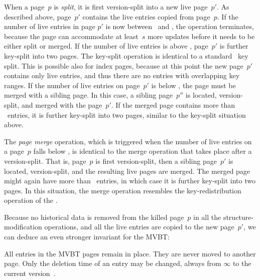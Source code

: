 When a page~$p$ is \emph{split}, it is first version-split into a new live
page~$p'$.
As described above, page~$p'$ contains the live entries copied from page~$p$.
If the number of live entries in page $p'$ is now between \minsplit\ and
\maxsplit, the operation terminates, because the page can accommodate at
least~$s$ more updates before it needs to be either split or merged.
If the number of live entries is above \maxsplit, page~$p'$ is further
key-split into two pages. 
The key-split operation is identical to a standard \Btree\ key split.
This is possible also for index pages, because at this point the
new page~$p'$ contains only live entries, and thus there are
no entries with overlapping key ranges.
If the number of live entries on page~$p'$ is below \minsplit, the page
must be merged with a sibling page. 
In this case, a sibling page~$p''$ is located, version-split, and merged with
the page~$p'$.
If the merged page contains more than \maxsplit\ entries, it is further
key-split into two pages, similar to the key-split situation above.

The \emph{page merge} operation, which is triggered when the number of live
entries on a page~$p$ falls below \minlive, is identical to the merge
operation that takes place after a version-split.
That is, page~$p$ is first version-split, then a sibling page~$p'$ is located,
version-split, and the resulting live pages are merged.
The merged page might again have more than \maxsplit\ entries, in which case
it is further key-split into two pages.
In this situation, the merge operation resembles the key-redistribution
operation of the \Btree.

% 
 
Because no historical data is removed from the killed page~$p$ in all the
structure-modification operations, and all the live entries are copied to the
new page~$p'$, we can deduce an even stronger invariant for the MVBT\@:

\thmskip
\begin{invariant}
\label{inv:mvbt-static-entries}
All entries in the MVBT pages remain in place. 
They are never moved to another page.
Only the deletion time of an entry may be changed, always from $\infty$ to
the current version~\comver.
\end{invariant}
\thmskip

